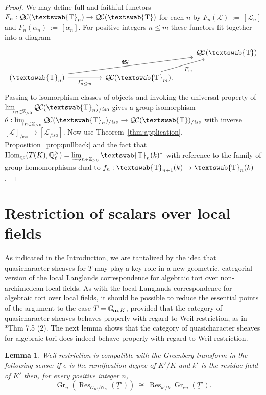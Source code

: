 \documentclass[11pt]{amsart}
\newcommand{\mathswab}[1]{\operatorname{\textswab{#1}}}
\theoremstyle{plain}
\newtheorem{lemma}[theorem]{Lemma}
\theoremstyle{definition}
\theoremstyle{remark}
\newcommand{\ZZ}{{\mathbb{Z}}}
\newcommand{\EE}{\mathbb{\bar Q}_\ell}
\newcommand{\OK}{\mathcal{O}_K}
\newcommand{\OKp}{\mathcal{O}_{K'}}
\newcommand{\Fq}{k}
\newcommand{\EEx}{\EE^\times}
\DeclareMathOperator{\Hom}{Hom}
\DeclareMathOperator{\Gr}{Gr}
\DeclareMathOperator{\Res}{Res}
\newcommand{\ceq}{{\, :=\, }}
\newcommand{\iso}{{\ \cong\ }}
\newcommand{\Gm}[1]{\mathbb{G}_{\hskip-1pt\textbf{m},#1}}
\newcommand{\GN}[1]{\mathswab{#1}}
\newcommand{\TTp}{\underline{T}'}
\newcommand{\qcs}[1]{{\mathcal{#1}}}
\newcommand{\QC}{{\mathcal{Q\hskip-0.8pt C}}}
\newcommand{\QCiso}[1]{\QC(#1)_{/\textit{iso}}}
\begin{document}
\begin{proof}
We may define full and faithful functors $F_n : \QC(\GN{T}_n) \to \QC(\GN{T})$
for each $n$ by $F_n(\qcs{L}) \ceq [\qcs{L}_n]$ and $F_n(\alpha_n) \ceq [\alpha_n]$.
For positive integers $n \le m$ these functors fit together into a diagram
\[
\begin{tikzcd}
\ & & & \QC(\GN{T})\\
\arrow{urrr}{F_n} \QC(\GN{T}_n) \arrow[swap]{rr}{f_{n\leq m}^*} && \QC(\GN{T}_m) \arrow[swap]{ur}{F_m}. & 
\end{tikzcd}
\]
Passing to isomorphism classes of objects and invoking the 
universal property of $\varinjlim_{n\in \ZZ_{>0}} \QCiso{\GN{T}_n}$ 
gives a group isomorphism
$\theta: \varinjlim_{n\in \ZZ_{>0}} \QCiso{\GN{T}_n} \to \QCiso{\GN{T}}$
with inverse $[\qcs{L}]_{/\text{iso}} \mapsto [\qcs{L}_{/\text{iso}}]$.
Now use Theorem~\ref{thm:application}, Proposition~\ref{prop:pullback} 
and the fact that  $\Hom_{\text{qc}}(T(K),\EEx) = \varinjlim_{n\in \ZZ_{>0}} \GN{T}_n(k)^*$ 
with reference to the family of group homomorphisms 
dual to $f_{n} : \GN{T}_{n+1}(\Fq) \to \GN{T}_n(\Fq)$.
\end{proof}


\section{Restriction of scalars over local fields}
\label{sec:wrK}

As indicated in the Introduction, we are tantalized 
by the idea that quasicharacter sheaves for $T$ 
may play a key role in a new geometric, categorial version 
of the local Langlands correspondence for algebraic tori 
over non-archimedean local fields. 
As with the local Langlands correspondence for algebraic tori over local fields, 
it should be possible to reduce the essential points of the argument to the case $T= \Gm{K}$,
provided that the category of quasicharacter sheaves behaves properly with regard to
Weil restriction, as in \cite{yu:09a}*{Thm 7.5 (2)}. 
The next lemma shows that the category of quasicharacter sheaves for 
algebraic tori does indeed behave properly with regard to Weil restriction.

\begin{lemma}\label{lemma:wrK}
Weil restriction is compatible with the Greenberg transform in the following sense: 
if $e$ is the ramification degree of $K'/K$ and $k'$ is the residue field of $K'$ then,
for every positive integer $n$,
\begin{equation}%
\Gr_{n}\left( \Res_{\OKp/\OK}(\TTp)\right)
\iso
\Res_{k'/k} \Gr_{en}(\TTp).
\end{equation}
\end{lemma}
\end{document}
